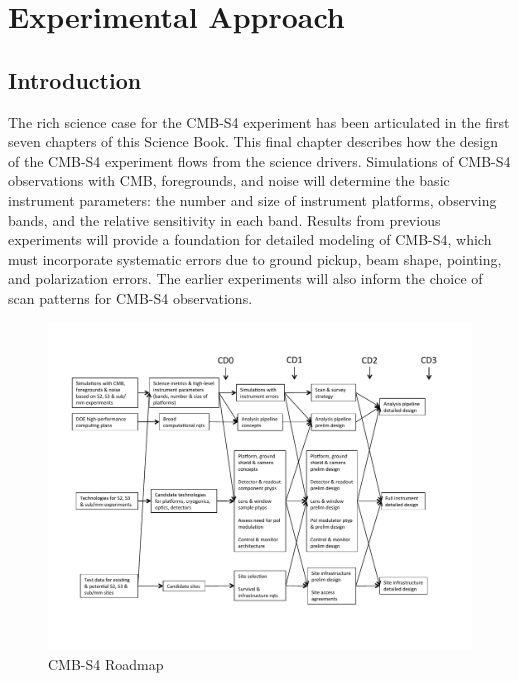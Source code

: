  
\chapter{Experimental Approach}

\def\nnu{N_{\mathrm eff}}
\def\gtrsim{\raise-.75ex\hbox{$\buildrel>\over\sim$}}

\section{Introduction}


The rich science case for the CMB-S4 experiment has been articulated in the first seven chapters of this Science Book.  This final chapter describes how the design of the CMB-S4 experiment flows from the science drivers.   Simulations of CMB-S4 observations with CMB, foregrounds, and noise will determine the basic instrument parameters: the number and size of instrument platforms, observing bands, and the relative sensitivity in each band. Results from previous experiments will provide a foundation for detailed modeling of CMB-S4, which must incorporate systematic errors due to ground pickup, beam shape, pointing, and polarization errors. The earlier experiments will also inform the choice of scan patterns for CMB-S4 observations.

\begin{figure}[h!]
\centering
\includegraphics[trim = 0.4in 0.7in 0.8in 0.7in, clip, width=1.0\textwidth]{Instrumentation/S4TechnicalDecisionsPlan.pdf}
\caption{CMB-S4 Roadmap}
\label{fig:roadmap}
\end{figure}



